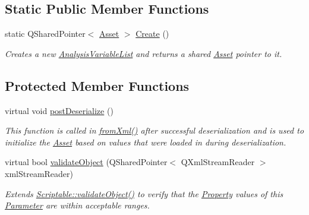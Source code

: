 \subsection*{Static Public Member Functions}
\begin{DoxyCompactItemize}
\item 
\hypertarget{class_picto_1_1_analysis_variable_list_a298f4f113f6b24d7905b362779d5cafe}{static Q\-Shared\-Pointer$<$ \hyperlink{class_picto_1_1_asset}{Asset} $>$ \hyperlink{class_picto_1_1_analysis_variable_list_a298f4f113f6b24d7905b362779d5cafe}{Create} ()}\label{class_picto_1_1_analysis_variable_list_a298f4f113f6b24d7905b362779d5cafe}

\begin{DoxyCompactList}\small\item\em Creates a new \hyperlink{class_picto_1_1_analysis_variable_list}{Analysis\-Variable\-List} and returns a shared \hyperlink{class_picto_1_1_asset}{Asset} pointer to it. \end{DoxyCompactList}\end{DoxyCompactItemize}
\subsection*{Protected Member Functions}
\begin{DoxyCompactItemize}
\item 
virtual void \hyperlink{class_picto_1_1_analysis_variable_list_a90f4446bd3f54918c492243e91d0bb8d}{post\-Deserialize} ()
\begin{DoxyCompactList}\small\item\em This function is called in \hyperlink{class_picto_1_1_asset_a8bed4da09ecb1c07ce0dab313a9aba67}{from\-Xml()} after successful deserialization and is used to initialize the \hyperlink{class_picto_1_1_asset}{Asset} based on values that were loaded in during deserialization. \end{DoxyCompactList}\item 
virtual bool \hyperlink{class_picto_1_1_analysis_variable_list_a5c16695870b3749708991034bc70990f}{validate\-Object} (Q\-Shared\-Pointer$<$ Q\-Xml\-Stream\-Reader $>$ xml\-Stream\-Reader)
\begin{DoxyCompactList}\small\item\em Extends \hyperlink{class_picto_1_1_scriptable_ab6e2944c43a3b5d418bf7b251594386d}{Scriptable\-::validate\-Object()} to verify that the \hyperlink{class_picto_1_1_property}{Property} values of this \hyperlink{class_picto_1_1_parameter}{Parameter} are within acceptable ranges. \end{DoxyCompactList}\end{DoxyCompactItemize}
